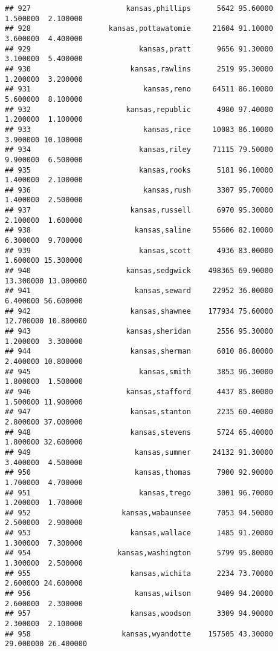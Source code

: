 \documentclass[
]{article}
\begin{document}
\begin{verbatim}
## 927                      kansas,phillips      5642 95.60000  1.500000  2.100000
## 928                  kansas,pottawatomie     21604 91.10000  3.600000  4.400000
## 929                         kansas,pratt      9656 91.30000  3.100000  5.400000
## 930                       kansas,rawlins      2519 95.30000  1.200000  3.200000
## 931                          kansas,reno     64511 86.10000  5.600000  8.100000
## 932                      kansas,republic      4980 97.40000  1.200000  1.100000
## 933                          kansas,rice     10083 86.10000  3.900000 10.100000
## 934                         kansas,riley     71115 79.50000  9.900000  6.500000
## 935                         kansas,rooks      5181 96.10000  1.400000  2.100000
## 936                          kansas,rush      3307 95.70000  1.400000  2.500000
## 937                       kansas,russell      6970 95.30000  2.100000  1.600000
## 938                        kansas,saline     55606 82.10000  6.300000  9.700000
## 939                         kansas,scott      4936 83.00000  1.600000 15.300000
## 940                      kansas,sedgwick    498365 69.90000 13.300000 13.000000
## 941                        kansas,seward     22952 36.00000  6.400000 56.600000
## 942                       kansas,shawnee    177934 75.60000 12.700000 10.800000
## 943                      kansas,sheridan      2556 95.30000  1.200000  3.300000
## 944                       kansas,sherman      6010 86.80000  2.400000 10.800000
## 945                         kansas,smith      3853 96.30000  1.800000  1.500000
## 946                      kansas,stafford      4437 85.80000  1.500000 11.900000
## 947                       kansas,stanton      2235 60.40000  2.800000 37.000000
## 948                       kansas,stevens      5724 65.40000  1.800000 32.600000
## 949                        kansas,sumner     24132 91.30000  3.400000  4.500000
## 950                        kansas,thomas      7900 92.90000  1.700000  4.700000
## 951                         kansas,trego      3001 96.70000  1.200000  1.700000
## 952                     kansas,wabaunsee      7053 94.50000  2.500000  2.900000
## 953                       kansas,wallace      1485 91.20000  1.300000  7.300000
## 954                    kansas,washington      5799 95.80000  1.300000  2.500000
## 955                       kansas,wichita      2234 73.70000  2.600000 24.600000
## 956                        kansas,wilson      9409 94.20000  2.600000  2.300000
## 957                       kansas,woodson      3309 94.90000  2.300000  2.100000
## 958                     kansas,wyandotte    157505 43.30000 29.000000 26.400000

\end{verbatim}
\end{document}
